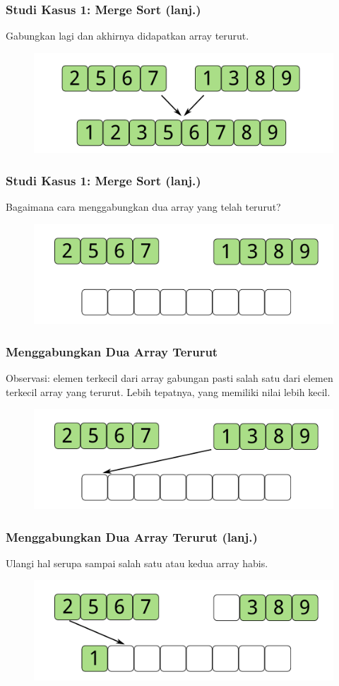 \begin{frame}
\frametitle{Studi Kasus 1: Merge Sort (lanj.)}
Gabungkan lagi dan akhirnya didapatkan array terurut.
\begin{figure}
  \centering
  \includegraphics[width=10 cm]{asset/merge-sort-demo-7.pdf}
\end{figure}
\end{frame}

\begin{frame}
\frametitle{Studi Kasus 1: Merge Sort (lanj.)}
Bagaimana cara menggabungkan dua array yang telah terurut?
\begin{figure}
  \centering
  \includegraphics[width=10 cm]{asset/merge-array-pair-1.pdf}
\end{figure}
\end{frame}

\begin{frame}
\frametitle{Menggabungkan Dua Array Terurut}
Observasi: elemen terkecil dari array gabungan pasti salah satu dari elemen terkecil array yang terurut. Lebih tepatnya, yang memiliki nilai lebih kecil.
\begin{figure}
  \centering
  \includegraphics[width=10 cm]{asset/merge-array-pair-2.pdf}
\end{figure}
\end{frame}

\begin{frame}
\frametitle{Menggabungkan Dua Array Terurut (lanj.)}
Ulangi hal serupa sampai salah satu atau kedua array habis.

\begin{figure}
  \centering
  \includegraphics[width=10 cm]{asset/merge-array-pair-3.pdf}
\end{figure}
\end{frame}

